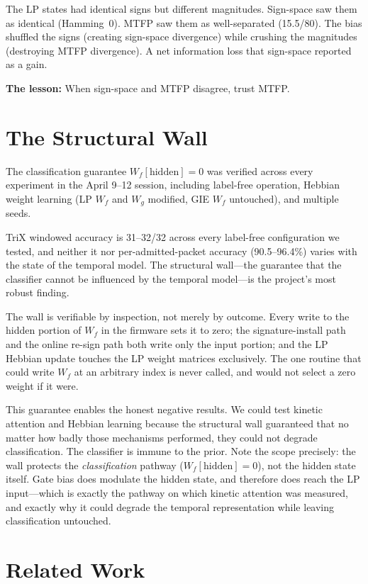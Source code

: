\documentclass[11pt,letterpaper]{article}
\begin{document}
The LP states had identical signs but different magnitudes. Sign-space saw them as identical (Hamming~0). MTFP saw them as well-separated (15.5/80). The bias shuffled the signs (creating sign-space divergence) while crushing the magnitudes (destroying MTFP divergence). A net information loss that sign-space reported as a gain.

\textbf{The lesson:} When sign-space and MTFP disagree, trust MTFP.

\section{The Structural Wall}

The classification guarantee $W_f[\text{hidden}] = 0$ was verified across every experiment in the April 9--12 session, including label-free operation, Hebbian weight learning (LP $W_f$ and $W_g$ modified, GIE $W_f$ untouched), and multiple seeds.

TriX windowed accuracy is 31--32/32 across every label-free configuration we tested, and neither it nor per-admitted-packet accuracy (90.5--96.4\%) varies with the state of the temporal model. The structural wall---the guarantee that the classifier cannot be influenced by the temporal model---is the project's most robust finding.

The wall is verifiable by inspection, not merely by outcome. Every write to the hidden portion of $W_f$ in the firmware sets it to zero; the signature-install path and the online re-sign path both write only the input portion; and the LP Hebbian update touches the LP weight matrices exclusively. The one routine that could write $W_f$ at an arbitrary index is never called, and would not select a zero weight if it were.

This guarantee enables the honest negative results. We could test kinetic attention and Hebbian learning because the structural wall guaranteed that no matter how badly those mechanisms performed, they could not degrade classification. The classifier is immune to the prior. Note the scope precisely: the wall protects the \emph{classification} pathway ($W_f[\text{hidden}] = 0$), not the hidden state itself. Gate bias does modulate the hidden state, and therefore does reach the LP input---which is exactly the pathway on which kinetic attention was measured, and exactly why it could degrade the temporal representation while leaving classification untouched.

\section{Related Work}
\end{document}
